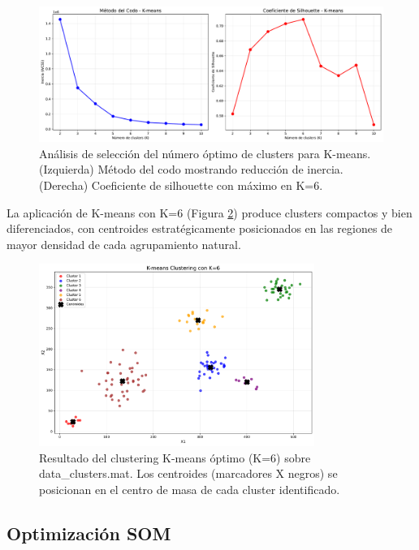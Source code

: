 \documentclass[12pt,a4paper]{article}
\begin{document}
\begin{figure}[H]
    \centering
    \includegraphics[width=\textwidth]{figures/figura_02_metodo_codo_kmeans.pdf}
    \caption{Análisis de selección del número óptimo de clusters para K-means. (Izquierda) Método del codo mostrando reducción de inercia. (Derecha) Coeficiente de silhouette con máximo en K=6.}
    \label{fig:metodo_codo}
\end{figure}

La aplicación de K-means con K=6 (Figura \ref{fig:kmeans_optimo}) produce clusters compactos y bien diferenciados, con centroides estratégicamente posicionados en las regiones de mayor densidad de cada agrupamiento natural.

\begin{figure}[H]
    \centering
    \includegraphics[width=0.8\textwidth]{figures/figura_03_kmeans_optimo.pdf}
    \caption{Resultado del clustering K-means óptimo (K=6) sobre data\_clusters.mat. Los centroides (marcadores X negros) se posicionan en el centro de masa de cada cluster identificado.}
    \label{fig:kmeans_optimo}
\end{figure}

\subsection{Optimización SOM}
\end{document}
